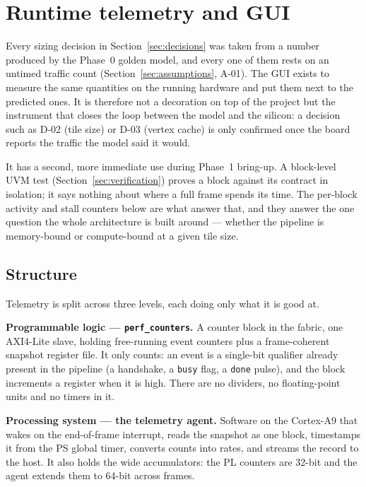 \documentclass[11pt,a4paper]{article}
\newcommand{\field}[1]{\textbf{#1}\quad}
\begin{document}
\section{Runtime telemetry and GUI}
\label{sec:gui}

Every sizing decision in Section~\ref{sec:decisions} was taken from a number
produced by the Phase~0 golden model, and every one of them rests on an
untimed traffic count (Section~\ref{sec:assumptions}, A-01). The GUI exists to
measure the same quantities on the running hardware and put them next to the
predicted ones. It is therefore not a decoration on top of the project but the
instrument that closes the loop between the model and the silicon: a decision
such as D-02 (tile size) or D-03 (vertex cache) is only confirmed once the
board reports the traffic the model said it would.

It has a second, more immediate use during Phase~1 bring-up. A block-level UVM
test (Section~\ref{sec:verification}) proves a block against its contract in
isolation; it says nothing about where a full frame spends its time. The
per-block activity and stall counters below are what answer that, and they
answer the one question the whole architecture is built around --- whether the
pipeline is memory-bound or compute-bound at a given tile size.

\subsection{Structure}

Telemetry is split across three levels, each doing only what it is good at.

\field{Programmable logic --- \texttt{perf\_counters}.} A counter block in the
fabric, one AXI4-Lite slave, holding free-running event counters plus a
frame-coherent snapshot register file. It only counts: an event is a single-bit
qualifier already present in the pipeline (a handshake, a \texttt{busy} flag, a
\texttt{done} pulse), and the block increments a register when it is high. There
are no dividers, no floating-point units and no timers in it.

\field{Processing system --- the telemetry agent.} Software on the Cortex-A9
that wakes on the end-of-frame interrupt, reads the snapshot as one block,
timestamps it from the PS global timer, converts counts into rates, and streams
the record to the host. It also holds the wide accumulators: the PL counters are
32-bit and the agent extends them to 64-bit across frames.
\end{document}
